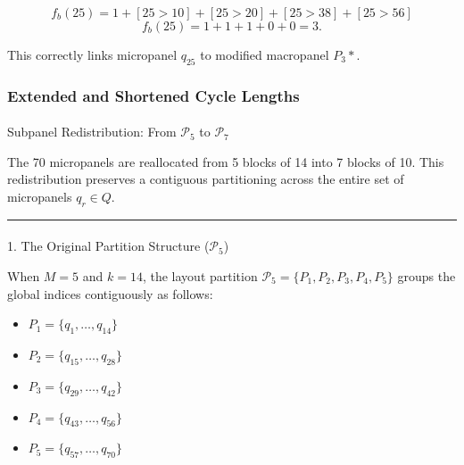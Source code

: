 \documentclass[
  number]{elsarticle}
\makeatletter
\let\oldparagraph\paragraph
\renewcommand{\paragraph}{
    \@ifstar
      \xxxParagraphStar
      \xxxParagraphNoStar
  }
\newcommand{\xxxParagraphStar}[1]{\oldparagraph*{#1}\mbox{}}
\newcommand{\xxxParagraphNoStar}[1]{\oldparagraph{#1}\mbox{}}
\providecommand{\tightlist}{%
  \setlength{\itemsep}{0pt}\setlength{\parskip}{0pt}}
\makeatother
\begin{document}
\[f_b(25) = 1 + [25 > 10] + [25 > 20] + [25 > 38] + [25 > 56]\]
\[f_b(25) = 1 + 1 + 1 + 0 + 0 = 3.\]

This correctly links micropanel \(q_{25}\) to modified macropanel
\(P_3*\).

\subsubsection{Extended and Shortened Cycle
Lengths}\label{extended-and-shortened-cycle-lengths-1}

\paragraph{\texorpdfstring{Subpanel Redistribution: From
\(\mathcal{P}_{5}\) to
\(\mathcal{P}_{7}\)}{Subpanel Redistribution: From \textbackslash mathcal\{P\}\_\{5\} to \textbackslash mathcal\{P\}\_\{7\}}}\label{subpanel-redistribution-from-mathcalp_5-to-mathcalp_7}

The 70 micropanels are reallocated from 5 blocks of 14 into 7 blocks of
10. This redistribution preserves a contiguous partitioning across the
entire set of micropanels \(q_r \in Q\).

\begin{center}\rule{0.5\linewidth}{0.5pt}\end{center}

\paragraph{\texorpdfstring{1. The Original Partition Structure
(\(\mathcal{P}_{5}\))}{1. The Original Partition Structure (\textbackslash mathcal\{P\}\_\{5\})}}\label{the-original-partition-structure-mathcalp_5}

When \(M = 5\) and \(k = 14\), the layout partition
\(\mathcal{P}_5 = \{P_1, P_2, P_3, P_4, P_5\}\) groups the global
indices contiguously as follows:

\begin{itemize}
\tightlist
\item
  \(P_1 = \{q_1, \dots, q_{14}\}\)
\item
  \(P_2 = \{q_{15}, \dots, q_{28}\}\)
\item
  \(P_3 = \{q_{29}, \dots, q_{42}\}\)
\item
  \(P_4 = \{q_{43}, \dots, q_{56}\}\)
\item
  \(P_5 = \{q_{57}, \dots, q_{70}\}\)
\end{itemize}
\end{document}
